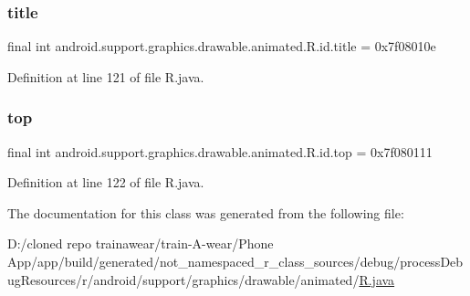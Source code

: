 \subsubsection{\texorpdfstring{title}{title}}
{\footnotesize\ttfamily final int android.\+support.\+graphics.\+drawable.\+animated.\+R.\+id.\+title = 0x7f08010e\hspace{0.3cm}{\ttfamily [static]}}



Definition at line 121 of file R.\+java.

\mbox{\label{classandroid_1_1support_1_1graphics_1_1drawable_1_1animated_1_1_r_1_1id_a9ba6768ae53717c0d6be15c41b3d19ae}} 
\subsubsection{\texorpdfstring{top}{top}}
{\footnotesize\ttfamily final int android.\+support.\+graphics.\+drawable.\+animated.\+R.\+id.\+top = 0x7f080111\hspace{0.3cm}{\ttfamily [static]}}



Definition at line 122 of file R.\+java.



The documentation for this class was generated from the following file\+:\begin{DoxyCompactItemize}
\item 
D\+:/cloned repo trainawear/train-\/\+A-\/wear/\+Phone App/app/build/generated/not\+\_\+namespaced\+\_\+r\+\_\+class\+\_\+sources/debug/process\+Debug\+Resources/r/android/support/graphics/drawable/animated/\mbox{\hyperlink{process_debug_resources_2r_2android_2support_2graphics_2drawable_2animated_2_r_8java}{R.\+java}}\end{DoxyCompactItemize}

